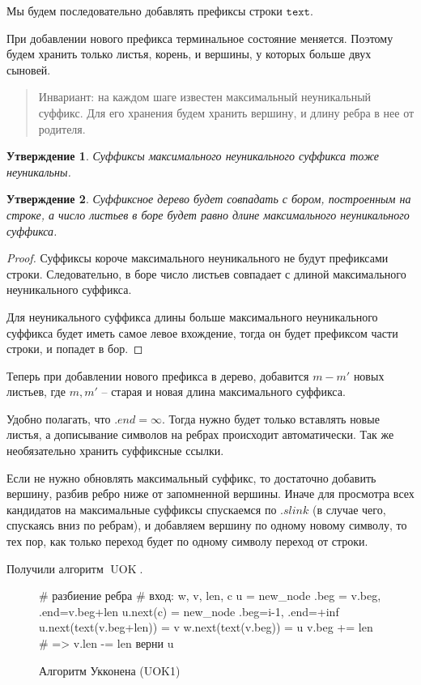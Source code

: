 \documentclass[10pt]{book}
\theoremstyle{plain}
\newtheorem{stm}{Утверждение}[section]
\newcommand{\textm}{\texttt{text}}
\newenvironment{figurem}[1][]
  {\begin{figure}[p]
  \caption{#1}
  \centering
  }
  {
  \end{figure}
  }
\begin{document}
Мы будем последовательно добавлять префиксы строки $\textm$.

При добавлении нового префикса терминальное состояние меняется. Поэтому будем
хранить только листья, корень, и вершины, у которых больше двух сыновей.
\begin{quotation}
  Инвариант: на каждом шаге известен максимальный неуникальный суффикс.
  Для его хранения будем хранить вершину, и длину ребра в нее от родителя.
\end{quotation}

\begin{stm}
  Суффиксы максимального неуникального суффикса тоже неуникальны.
\end{stm}

\begin{stm}
  Суффиксное дерево будет совпадать с бором, построенным на строке, а число
  листьев в боре будет равно длине максимального неуникального суффикса.
\end{stm}
\begin{proof}
  Суффиксы короче максимального неуникального не будут префиксами строки.
  Следовательно, в боре число листьев совпадает с длиной максимального
  неуникального суффикса.

  Для неуникального суффикса длины больше максимального неуникального суффикса
  будет иметь самое левое вхождение, тогда он будет префиксом части строки, и
  попадет в бор.
\end{proof}

Теперь при добавлении нового префикса в дерево, добавится $m - m'$ новых
листьев, где $m, m'$ -- старая и новая длина максимального суффикса.

Удобно полагать, что $.end = \infty$. Тогда нужно будет только вставлять новые
листья, а дописывание символов на ребрах происходит автоматически. Так же
необязательно хранить суффиксные ссылки.

Если не нужно обновлять максимальный суффикс, то достаточно добавить вершину,
разбив ребро ниже от запомненной вершины. Иначе для просмотра всех кандидатов на
максимальные суффиксы спускаемся по $.slink$ (в случае чего, спускаясь вниз по
ребрам), и добавляем вершину по одному новому символу, то тех пор, как только
переход будет по одному символу переход от строки.

Получили алгоритм $\operatorname{UOK}$.

\begin{figurem}[Алгоритм Укконена (UOK1)]
\begin{verbm}
  # разбиение ребра
  # вход: w, v, len, c
  u = new_node {.beg = v.beg, .end=v.beg+len}
  u.next(c) = new_node {.beg=i-1, .end=+inf}
  u.next(text(v.beg+len)) = v
  w.next(text(v.beg)) = u
  v.beg += len  # => v.len -= len
  верни u
\end{verbm}
\end{figurem}
\end{document}
